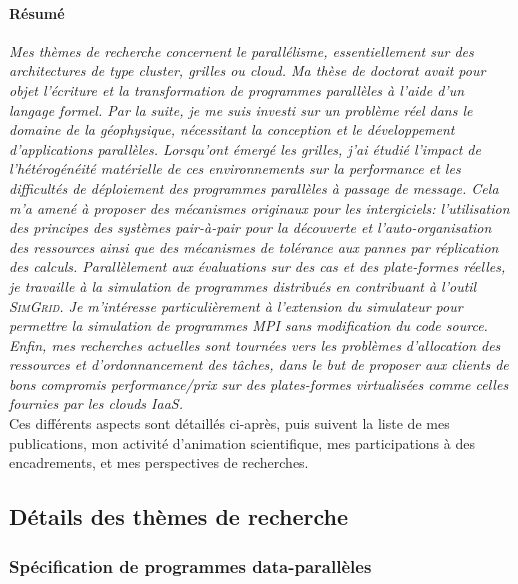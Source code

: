 \documentclass[11pt]{article}
\begin{document}
\paragraph{Résumé}
\textit{Mes   thèmes    de   recherche   concernent    le   \emph{parallélisme},
  essentiellement  sur  des architectures  de  type  cluster, \emph{grilles}  ou
  \emph{cloud}.   Ma  thèse  de  doctorat  avait pour  objet  l'écriture  et  la
  transformation de programmes parallèles à  l'aide d'un langage formel.  Par la
  suite,  je  me suis  investi  sur  un problème  réel  dans  le domaine  de  la
  géophysique,  nécessitant la  conception  et  le développement  d'applications
  parallèles.   Lorsqu'ont   émergé  les   grilles,  j'ai  étudié   l'impact  de
  l'hétérogénéité matérielle  de ces  environnements sur  la performance  et les
  difficultés de  déploiement des  programmes parallèles  à passage  de message.
  Cela  m'a amené  à proposer  des mécanismes  originaux pour  les intergiciels:
  l'utilisation des  principes des  systèmes pair-à-pair  pour la  découverte et
  l'auto-organisation des ressources  ainsi que des mécanismes  de tolérance aux
  pannes par réplication des calculs.  Parallèlement aux évaluations sur des cas
  et  des plate-formes  réelles,  je  travaille à  la  simulation de  programmes
  distribués  en   contribuant  à  l'outil  \textsc{SimGrid}.    Je  m'intéresse
  particulièrement à l'extension  du simulateur pour permettre  la simulation de
  programmes  MPI  sans modification  du  code  source.  Enfin,  mes  recherches
  actuelles  sont tournées  vers les  problèmes d'allocation  des ressources  et
  d'ordonnancement  des tâches,  dans le  but de  proposer aux  clients de  bons
  compromis  performance/prix sur  des plates-formes  virtualisées comme  celles
  fournies par les clouds IaaS.}\\

Ces différents  aspects sont détaillés  ci-après, puis  suivent la liste  de mes
publications, mon  activité d'animation  scientifique, mes participations  à des
encadrements, et mes perspectives de recherches.

\subsection{Détails des thèmes de recherche}


\subsubsection{Spécification de programmes data-parallèles}
\end{document}
